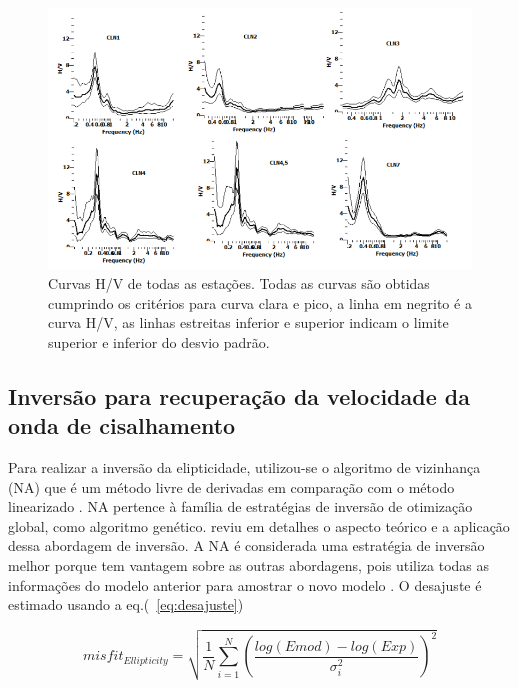 \documentclass[smallextended]{svjour3}       %
\begin{document}
\begin{figure}[!hbtp]
  \begin{center}
  
  \includegraphics[scale=0.75]{Figures/fig5.png}
  \end{center}
  \caption{Curvas H/V de todas as estações. Todas as curvas são obtidas cumprindo os critérios para curva clara e pico, a linha em negrito é a curva H/V, as linhas estreitas inferior e superior indicam o limite superior e inferior do desvio padrão.}
  \label{hv_curva}
\end{figure}
\newpage

\subsection{Inversão para recuperação da velocidade da onda de cisalhamento}

Para realizar a inversão da elipticidade, utilizou-se o algoritmo de vizinhança (NA) \citep{wathelet2008array} que é um método livre de derivadas em comparação com o método linearizado \citep{menke1989geophysical}. NA pertence à família de estratégias de inversão de otimização global, como algoritmo genético. \cite{sambridge2002monte} reviu em detalhes o aspecto teórico e a aplicação dessa abordagem de inversão. A NA é considerada uma estratégia de inversão melhor porque tem vantagem sobre as outras abordagens, pois utiliza todas as informações do modelo anterior para amostrar o novo modelo \citep{sambridge1999geophysical}. O desajuste é estimado usando a eq.(~\ref{eq:desajuste})  

\begin{equation}\label{eq:desajuste}
  misfit_{Ellipticity} = \sqrt{\frac{1}{N} \sum_{i=1}^{N}\left(\frac{log(Emod) - log(Exp)}{\sigma_i^2}\right)^2} 
\end{equation}
\end{document}
